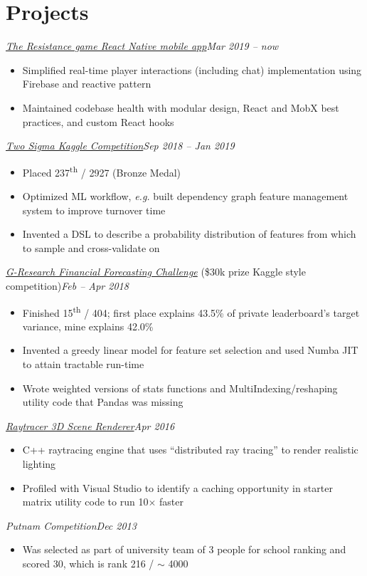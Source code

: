 \documentclass[10pt,letterpaper]{article}
\newcommand*\position[1]{\textit{#1}}
\newcommand*\timespan\position
\begin{document}
\section*{Projects}
\position{\href{https://github.com/yumichael/avalon}{The Resistance game React Native mobile app}}\hfill\timespan{Mar 2019 -- now}
\begin{itemize}
\item Simplified real-time player interactions (including chat) implementation using Firebase and reactive pattern
\item Maintained codebase health with modular design, React and MobX best practices, and custom React hooks
\end{itemize}
\position{\href{https://www.kaggle.com/c/two-sigma-financial-news/overview}{Two Sigma Kaggle Competition}}\hfill\timespan{Sep 2018 -- Jan 2019}
\begin{itemize}
\item Placed 237\textsuperscript{th} / 2927 (Bronze Medal)
\item Optimized ML workflow, \textit{e.g.} built dependency graph feature management system to improve turnover time
\item Invented a DSL to describe a probability distribution of features from which to sample and cross-validate on
\end{itemize}
\position{\href{https://financialforecasting.gresearch.co.uk/}{G-Research Financial Forecasting Challenge}} (\$30k prize Kaggle style competition)\hfill\timespan{Feb -- Apr 2018}
\begin{itemize}
\item Finished 15\textsuperscript{th} / 404; first place explains 43.5\% of private leaderboard's target variance, mine explains 42.0\%
\item Invented a greedy linear model for feature set selection and used Numba JIT to attain tractable run-time
\item Wrote weighted versions of stats functions and MultiIndexing/reshaping utility code that Pandas was missing
\end{itemize}
\position{\href{https://github.com/yumichael/raytrace}{Raytracer 3D Scene Renderer}}\hfill\timespan{Apr 2016}
\begin{itemize}
\item C++ raytracing engine that uses ``distributed ray tracing'' to render realistic lighting
\item Profiled with Visual Studio to identify a caching opportunity in starter matrix utility code to run 10\(\times\) faster
\end{itemize}
\position{Putnam Competition}\hfill\timespan{Dec 2013}
\begin{itemize}
\item Was selected as part of university team of 3 people for school ranking and scored 30, which is rank 216 / \(\sim\) 4000
\end{itemize}
\end{document}
